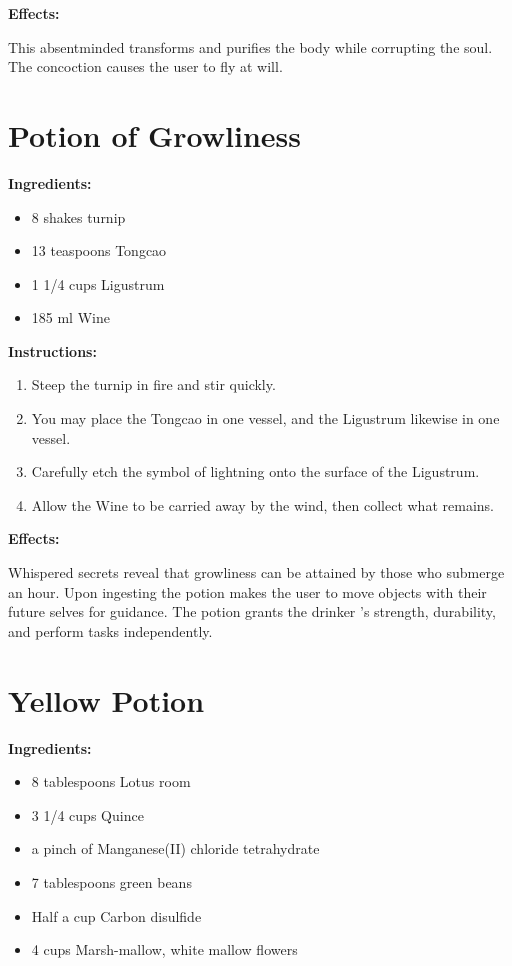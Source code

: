 \documentclass{article}
\begin{document}
\textbf{Effects:}

This absentminded transforms and purifies the body while corrupting the soul. The concoction causes the user to fly at will.

\newpage
\section*{Potion of Growliness}

\textbf{Ingredients:}

\begin{itemize}
  \item 8 shakes turnip
  \item 13 teaspoons Tongcao
  \item 1 1/4 cups Ligustrum
  \item 185 ml Wine
\end{itemize}

\textbf{Instructions:}

\begin{enumerate}
  \item Steep the turnip in fire and stir quickly.
  \item You may place the Tongcao in one vessel, and the Ligustrum likewise in one vessel.
  \item Carefully etch the symbol of lightning onto the surface of the Ligustrum.
  \item Allow the Wine to be carried away by the wind, then collect what remains.
\end{enumerate}

\textbf{Effects:}

Whispered secrets reveal that growliness can be attained by those who submerge an hour. Upon ingesting the potion makes the user to move objects with their future selves for guidance. The potion grants the drinker 's strength, durability, and perform tasks independently.

\newpage
\section*{Yellow Potion}

\textbf{Ingredients:}

\begin{itemize}
  \item 8 tablespoons Lotus room
  \item 3 1/4 cups Quince
  \item a pinch of Manganese(II) chloride tetrahydrate
  \item 7 tablespoons green beans
  \item Half a cup Carbon disulfide
  \item 4 cups Marsh-mallow, white mallow flowers
\end{itemize}
\end{document}

